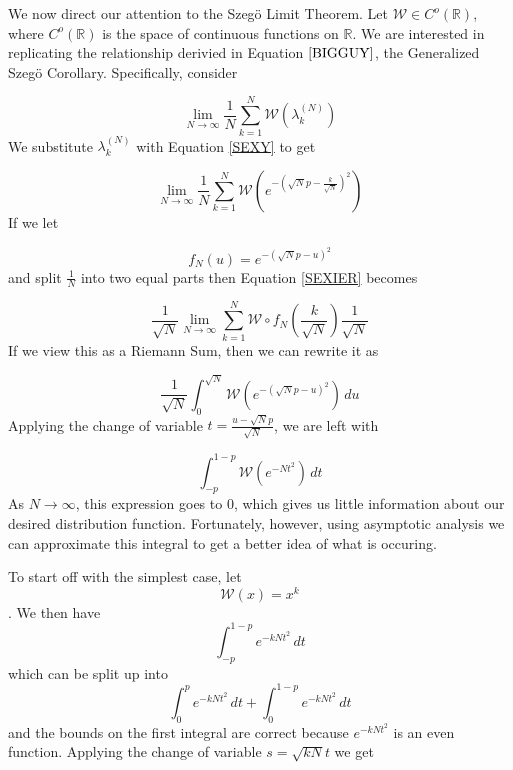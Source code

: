 \documentclass{article}
\begin{document}
We now direct our attention to the Szeg\"{o} Limit Theorem.  Let $\mathcal{W} \in C^{o}(\mathbb{R})$, where $C^{o}(\mathbb{R})$ is the space of continuous functions on $\mathbb{R}$.  We are interested in replicating the relationship derivied in Equation $\ref{BIGGUY}$, the Generalized Szeg\"{o} Corollary. Specifically, consider 

\begin{equation}
 \lim_{N\to\infty}\frac{1}{N}\displaystyle\sum\limits_{k=1}^{N}\mathcal{W}(\lambda_{k}^{(N)}) 
\end{equation}  We substitute $\lambda_k^{(N)}$ with Equation \ref{SEXY} to get
 
\begin{equation} 
\lim_{N\to\infty}\frac{1}{N}\displaystyle\sum\limits_{k=1}^{N}\mathcal{W}(e^{-(\sqrt{N}p-\frac{k}{\sqrt{N}})^2}) \label{SEXIER}
\end{equation} If we let 

\begin{equation} 
f_N(u) = e^{-(\sqrt{N}p-u)^2} 
\end{equation} and split $\frac{1}{N}$ into two equal parts then Equation \ref{SEXIER} becomes 

\begin{equation} 
\frac{1}{\sqrt{N}}\lim_{N\to\infty}\displaystyle\sum\limits_{k=1}^{N}\mathcal{W} \circ f_{N}\left(\frac{k}{\sqrt{N}}\right)\frac{1}{\sqrt{N}}
\end{equation}  If we view this as a Riemann Sum, then we can rewrite it as 

\begin{equation} 
\frac{1}{\sqrt{N}}\int_0^{\sqrt{N}}\mathcal{W}(e^{-(\sqrt{N}p-u)^2})\,du 
\end{equation}  Applying the change of variable $t = \frac{u-\sqrt{N}p}{\sqrt{N}}$, we are left with 

\begin{equation} 
\int_{-p}^{1-p}\mathcal{W}(e^{-Nt^2})\,dt 
\end{equation} As $N\to\infty$, this expression goes to 0, which gives us little information about our desired distribution function. Fortunately, however, using asymptotic analysis we can approximate this integral to get a better idea of what is occuring.

To start off with the simplest case, let $$\mathcal{W}(x) = x^k$$.  We then have $$\int_{-p}^{1-p}e^{-kNt^2}\,dt$$ which can be split up into $$\int_0^{p}e^{-kNt^2}\,dt + \int_0^{1-p}e^{-kNt^2}\,dt$$ and the bounds on the first integral are correct because $e^{-kNt^2}$ is an even function.  Applying the change of variable $s = \sqrt{kN}t$ we get 
\end{document}
